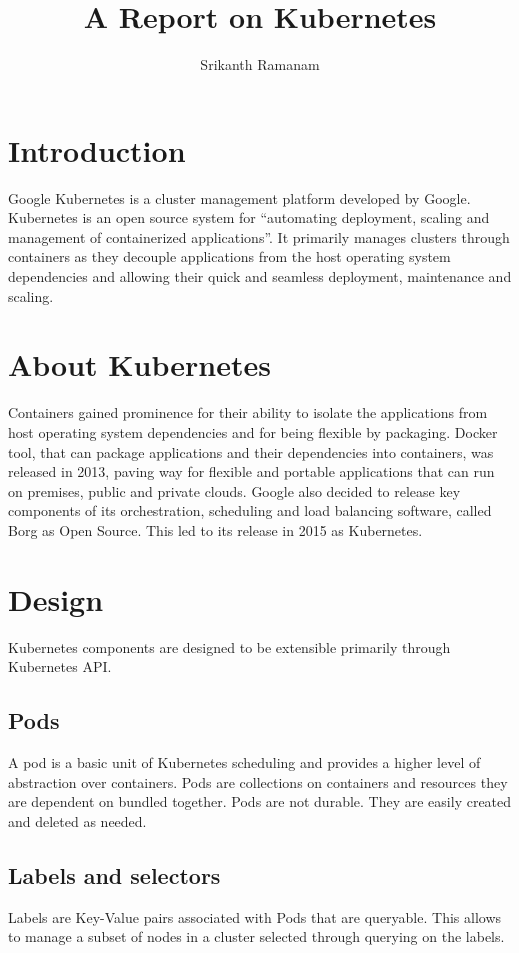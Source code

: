 \documentclass[9pt,twocolumn,twoside]{styles/osajnl}
\title{A Report on Kubernetes}
\author[1]{Srikanth Ramanam}
\affil[1]{School of Informatics and Computing, Bloomington, IN 47408, U.S.A.}
\affil[*]{Corresponding authors: srikrama@iu.edu}
\begin{document}
\maketitle

\section{Introduction}
Google Kubernetes is a cluster management platform developed by Google. Kubernetes is an open source system for “automating deployment, scaling and management of containerized applications”.\cite{www-kubernetesdoc} It primarily manages clusters through containers as they decouple applications from the host operating system dependencies and allowing their quick and seamless deployment, maintenance and scaling.




\section{About Kubernetes}

Containers gained prominence for their ability to isolate the applications from host operating system dependencies and for being flexible by packaging. Docker tool, that can package applications and their dependencies into containers, was released in 2013, paving way for flexible and portable applications that can run on premises, public and private clouds. Google also decided to release key components of its orchestration, scheduling and load balancing software, called Borg as Open Source. This led to its release in 2015 as Kubernetes.\cite{www-kubernetesebook}



\section{Design}
Kubernetes components are designed to be extensible primarily through Kubernetes API. 
\subsection{Pods}
A pod is a basic unit of Kubernetes scheduling and provides a higher level of abstraction over containers. Pods are collections on containers and resources they are dependent on bundled together. Pods are not durable. They are easily created and deleted as needed.
\subsection{Labels and selectors}
Labels are Key-Value pairs associated with Pods that are queryable. This allows to manage a subset of nodes in a cluster selected through querying on the labels.
\end{document}
